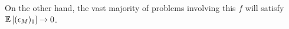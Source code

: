On the other hand, the vast majority of problems involving this $f$ will satisfy $\mathbb{E}\left[(\epsilon_M)_1\right] \to 0$.

%
%
%

